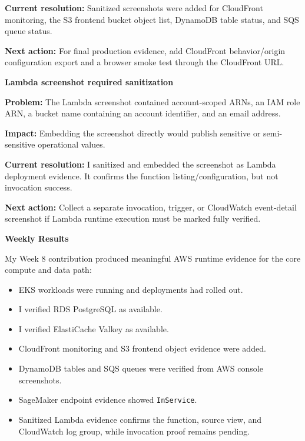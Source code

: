 \textbf{Current resolution:} Sanitized screenshots were added for
CloudFront monitoring, the S3 frontend bucket object list, DynamoDB
table status, and SQS queue status.

\textbf{Next action:} For final production evidence, add CloudFront
behavior/origin configuration export and a browser smoke test through
the CloudFront URL.

\vspace{0.5em}\noindent\textbf{Lambda screenshot required
sanitization}\par

\textbf{Problem:} The Lambda screenshot contained account-scoped ARNs,
an IAM role ARN, a bucket name containing an account identifier, and an
email address.

\textbf{Impact:} Embedding the screenshot directly would publish
sensitive or semi-sensitive operational values.

\textbf{Current resolution:} I sanitized and embedded the screenshot as
Lambda deployment evidence. It confirms the function
listing/configuration, but not invocation success.

\textbf{Next action:} Collect a separate invocation, trigger, or
CloudWatch event-detail screenshot if Lambda runtime execution must be
marked fully verified.

\vspace{0.5em}\noindent\textbf{Weekly Results}\par

My Week 8 contribution produced meaningful AWS runtime evidence for the
core compute and data path:

\begin{itemize}
\tightlist
\item
  EKS workloads were running and deployments had rolled out.
\item
  I verified RDS PostgreSQL as available.
\item
  I verified ElastiCache Valkey as available.
\item
  CloudFront monitoring and S3 frontend object evidence were added.
\item
  DynamoDB tables and SQS queues were verified from AWS console
  screenshots.
\item
  SageMaker endpoint evidence showed \texttt{InService}.
\item
  Sanitized Lambda evidence confirms the function, source view, and
  CloudWatch log group, while invocation proof remains pending.
\end{itemize}

